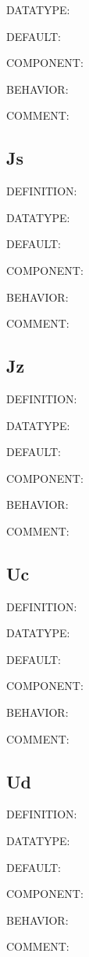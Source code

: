 {\color{green}DATATYPE:}

{\color{blue}DEFAULT:}

{\color{brown}COMPONENT:}

{\color{purple}BEHAVIOR:}

{\color{olive}COMMENT:}

\subsection{Js}
{\color{red}DEFINITION:}

{\color{green}DATATYPE:}

{\color{blue}DEFAULT:}

{\color{brown}COMPONENT:}

{\color{purple}BEHAVIOR:}

{\color{olive}COMMENT:}

\subsection{Jz}
{\color{red}DEFINITION:}

{\color{green}DATATYPE:}

{\color{blue}DEFAULT:}

{\color{brown}COMPONENT:}

{\color{purple}BEHAVIOR:}

{\color{olive}COMMENT:}

\subsection{Uc}
{\color{red}DEFINITION:}

{\color{green}DATATYPE:}

{\color{blue}DEFAULT:}

{\color{brown}COMPONENT:}

{\color{purple}BEHAVIOR:}

{\color{olive}COMMENT:}

\subsection{Ud}
{\color{red}DEFINITION:}

{\color{green}DATATYPE:}

{\color{blue}DEFAULT:}

{\color{brown}COMPONENT:}

{\color{purple}BEHAVIOR:}

{\color{olive}COMMENT:}

